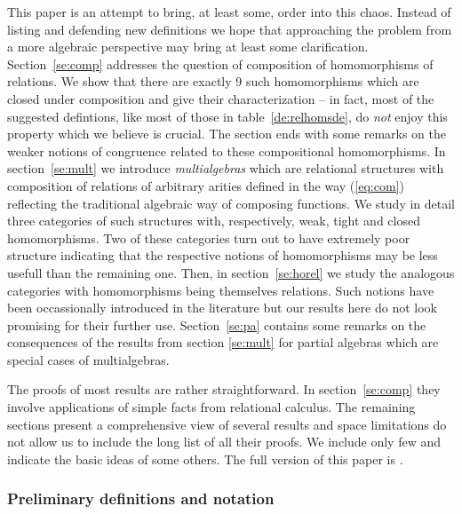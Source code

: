 \documentclass[10pt]{article}
\begin{document}
This paper is an attempt to bring, at least some, order into this
chaos. 
Instead of listing and defending new definitions
we hope that approaching the problem from a more algebraic perspective
may bring at least some clarification.  Section~\ref{se:comp}
addresses the question of composition of homomorphisms of relations. 
We show that there are exactly 9 such
homomorphisms which are closed under composition and
give their characterization  -- in fact, most of
the suggested defintions, like most of those in
table~\ref{de:relhomsde}, do {\em not} enjoy this property which we
believe is crucial. The section ends with some remarks on the weaker notions
of congruence related to these compositional homomorphisms.
%
In section~\ref{se:mult} we introduce {\em
multialgebras} which are relational structures with composition of
relations of arbitrary arities defined in the way (\ref{eq:com}) 
reflecting the traditional algebraic way of
composing functions.  We study in detail three categories of such structures with, 
respectively, weak, tight and closed homomorphisms. Two of these categories
turn out to have extremely poor structure indicating that the respective
notions of homomorphisms may be less usefull than the remaining one.
Then, in section~\ref{se:horel} we study the analogous
categories with homomorphisms being themselves relations. Such notions have
been occassionally introduced in the literature but our results here  do not 
look promising for their further use.
Section~\ref{se:pa} contains some remarks on
the consequences of the results from section \ref{se:mult} for partial
algebras which are special cases of multialgebras.

The proofs of most results are rather straightforward. In section~\ref{se:comp} 
they involve applications of simple facts from relational calculus. 
The remaining sections present a comprehensive view of several results and
space limitations do not allow us to include the long list of all their proofs.
We include only few and indicate the
basic ideas of some others. The full version of this paper is \cite{BW97}.

\subsubsection*{Preliminary definitions and notation}
\end{document}
